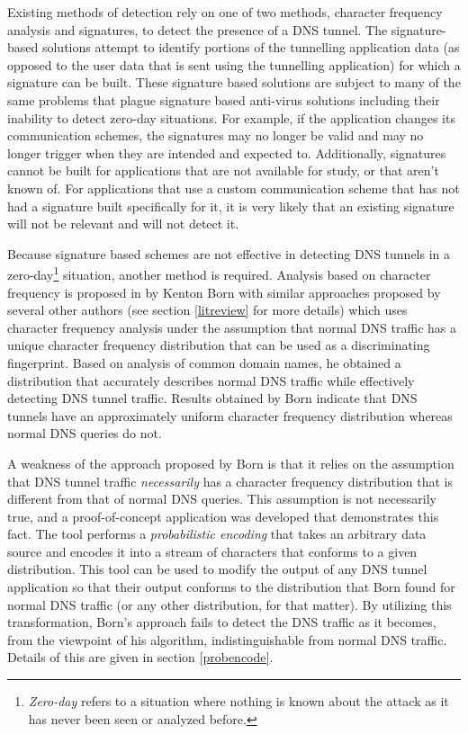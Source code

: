 \documentclass[12pt]{report}
\theoremstyle{remark}
\theoremstyle{definition}
\theoremstyle{definition}
\theoremstyle{definition}
\begin{document}
Existing methods of detection rely on one of two methods, character frequency
analysis
and signatures, to detect the presence of a DNS tunnel. The signature-based
solutions attempt to identify portions of the tunnelling
application data (as opposed to the user data that is sent using the tunnelling
application) for which a signature can be built. These signature based
solutions are subject to many of the same problems that plague signature based
anti-virus solutions including their inability to detect zero-day situations.
 For example, if the application changes its communication
schemes, the signatures may no longer be valid and may no longer trigger when
they are intended and expected to. Additionally, signatures cannot be built for
applications
that are not available for study, or that aren't known of. For applications
that use a custom communication scheme that has not had a signature built
specifically for it, it is very likely that an existing signature will not be
relevant and will not detect it.

Because signature based schemes are not effective in detecting DNS tunnels in a
zero-day\footnote{\emph{Zero-day} refers to a situation where nothing is
known about the attack as it has never been seen or analyzed before.} situation,
another
method is required. Analysis based on character frequency is proposed
in\cite{Born2010.cfa} by Kenton Born with similar approaches proposed by several
other authors (see section \ref{litreview} for more details) which uses
character
frequency analysis under the assumption that normal DNS traffic has a unique
character frequency distribution that can be used as a discriminating
fingerprint. Based on analysis of common domain names, he obtained a
distribution that accurately describes normal DNS traffic while
effectively detecting DNS tunnel traffic. Results obtained by Born indicate
that DNS tunnels have an approximately uniform character frequency distribution
whereas normal DNS queries do not.

A weakness of the approach proposed by Born is that it relies on the assumption
that DNS tunnel traffic \emph{necessarily} has a character frequency
distribution that is different from that of normal DNS queries. This assumption
is not necessarily true, and a proof-of-concept application
was developed that demonstrates this fact. The tool performs a
\emph{probabilistic encoding} that takes an arbitrary data source and encodes
it into a stream of characters that conforms to a given distribution. This tool
can be used to modify the output of any DNS tunnel application so that their
output conforms to the distribution that Born found for normal DNS traffic (or
any other distribution, for that matter). By
utilizing this transformation, Born's approach fails to detect the DNS traffic
as it becomes, from the viewpoint of his algorithm, indistinguishable from
normal DNS traffic. Details of this are given in section \ref{probencode}.
\end{document}
